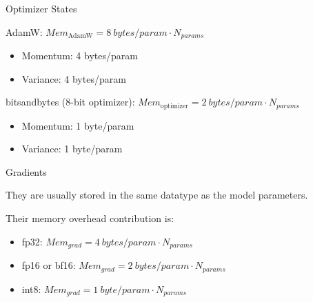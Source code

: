 
\begin{vbframe}{Optimizer States}

\vfill

AdamW: $Mem_{\text{AdamW}} = 8 ~bytes/param \cdot N_{params}$
\begin{itemize}
    \item Momentum: 4 bytes/param
	\item Variance: 4 bytes/param
\end{itemize}

\vskip3mm

bitsandbytes (8-bit optimizer): $Mem_{\text{optimizer}} = 2 ~bytes/param \cdot N_{params}$
\begin{itemize}
    \item Momentum: 1 byte/param
	\item Variance: 1 byte/param
\end{itemize}

\vskip3mm



\vfill

\end{vbframe}


\begin{vbframe}{Gradients}

\vfill

They are usually stored in the same datatype as the model parameters. \newline

Their memory overhead contribution is: \newline

\begin{itemize}
 	\item fp32: $Mem_{grad} = 4 ~bytes/param \cdot N_{params}$
 	\item fp16 or bf16: $Mem_{grad} = 2 ~bytes/param \cdot N_{params}$
	\item int8: $Mem_{grad} = 1 ~byte/param \cdot N_{params}$
\end{itemize}

\vfill

\end{vbframe}

